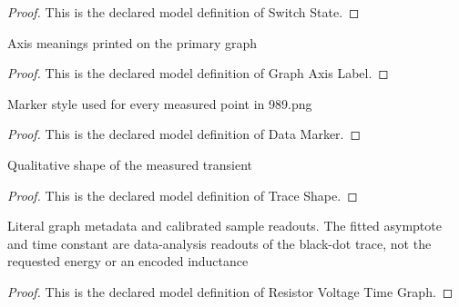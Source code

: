 \begin{proof}
  This is the declared model definition of Switch State.
\end{proof}
\begin{definition}
  \label{def:physics:phyx-mini-0989:phyxminiproblems-problemphyxmini0989-graphaxislabel}
  Axis meanings printed on the primary graph
\end{definition}
\begin{proof}
  This is the declared model definition of Graph Axis Label.
\end{proof}
\begin{definition}
  \label{def:physics:phyx-mini-0989:phyxminiproblems-problemphyxmini0989-datamarker}
  Marker style used for every measured point in 989.png
\end{definition}
\begin{proof}
  This is the declared model definition of Data Marker.
\end{proof}
\begin{definition}
  \label{def:physics:phyx-mini-0989:phyxminiproblems-problemphyxmini0989-traceshape}
  Qualitative shape of the measured transient
\end{definition}
\begin{proof}
  This is the declared model definition of Trace Shape.
\end{proof}
\begin{definition}
  \label{def:physics:phyx-mini-0989:phyxminiproblems-problemphyxmini0989-resistorvoltagetimegraph}
  Literal graph metadata and calibrated sample readouts. The fitted asymptote and time constant are data-analysis readouts of the black-dot trace, not the requested energy or an encoded inductance
\end{definition}
\begin{proof}
  This is the declared model definition of Resistor Voltage Time Graph.
\end{proof}
